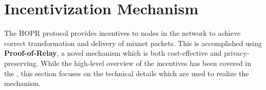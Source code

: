 \section{Incentivization Mechanism}

The HOPR protocol provides incentives to nodes in the network to achieve correct
transformation and delivery of mixnet packets. This is accomplished using
\textbf{Proof-of-Relay}, a novel mechanism which is both cost-effective and
privacy-preserving. While the high-level overview of the incentives has been
covered in the , this section focuses on the
technical details which are used to realize the mechanism.






